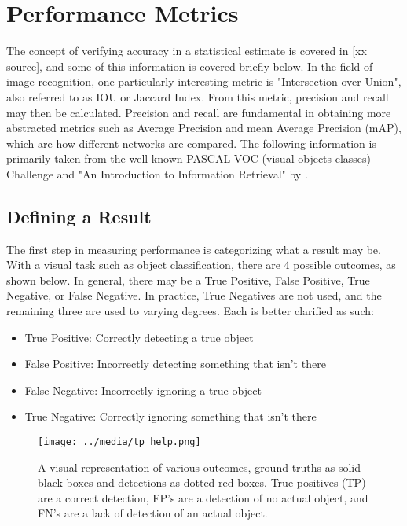 

\section{Performance Metrics}
\label{AppendixMetrics}
The concept of verifying accuracy in a statistical estimate is covered in [xx source], and some of this information is covered briefly below. In the field of image recognition, one particularly interesting metric is "Intersection over Union", also referred to as IOU or Jaccard Index. From this metric, precision and recall may then be calculated. Precision and recall are fundamental in obtaining more abstracted metrics such as Average Precision and mean Average Precision (mAP), which are how different networks are compared. The following information is primarily taken from the well-known PASCAL VOC (visual objects classes) Challenge \cite{everingham_pascal_2010} and "An Introduction to Information Retrieval" by \cite{manning_introduction_2008}.

\subsection{Defining a Result}
The first step in measuring performance is categorizing what a result may be. With a visual task such as object classification, there are 4 possible outcomes, as shown below. In general, there may be a True Positive, False Positive, True Negative, or False Negative. In practice, True Negatives are not used, and the remaining three are used to varying degrees. Each is better clarified as such:
\begin{itemize} \itemsep=-.5em
	\item True Positive: Correctly detecting a true object
	\item False Positive: Incorrectly detecting something that isn't there
	\item False Negative: Incorrectly ignoring a true object
	\item True Negative: Correctly ignoring something that isn't there
\end{itemize}

\begin{figure}[h] %
	\centering
	\texttt{[image: ../media/tp\_help.png]}
	\caption{A visual representation of various outcomes, ground truths as solid black boxes and detections as dotted red boxes. True positives (TP) are a correct detection, FP's are a detection of no actual object, and FN's are a lack of detection of an actual object.}
	\label{tp_help} %
\end{figure}

